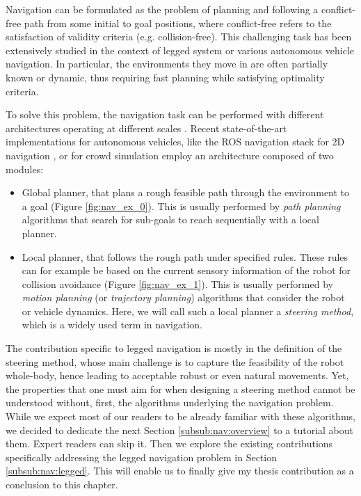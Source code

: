 Navigation can be formulated as the problem of planning and following a conflict-free path from some initial to goal positions, where conflict-free refers to the satisfaction of validity criteria (e.g. collision-free).
This challenging task has been extensively studied in the context of legged system or various autonomous vehicle navigation.
In particular, the environments they move in are often partially known or dynamic, thus requiring fast planning while satisfying optimality criteria.

To solve this problem, the navigation task can be performed with different architectures operating at different scales \cite{review_autonomous_2011}. 
Recent state-of-the-art implementations for autonomous vehicles, like the ROS navigation stack for 2D navigation \cite{ROS_software}, or for crowd simulation \cite{vantoll_microscopic_crowd_2021} employ an architecture composed of two modules:
\begin{itemize}
    \item Global planner, that plans a rough feasible path through the environment to a goal (Figure \ref{fig:nav_ex_0}). This is usually performed by \textit{path planning} algorithms that search for sub-goals to reach sequentially with a local planner.
    \item Local planner, that follows the rough path under specified rules. These rules can for example be based on the current sensory information of the robot for collision avoidance (Figure \ref{fig:nav_ex_1}). 
    This is usually performed by \textit{motion planning} (or \textit{trajectory planning}) algorithms that consider the robot or vehicle dynamics. Here, we will call such a local planner a \textit{steering method}, which is a widely used term in navigation.
\end{itemize}


The contribution specific to legged navigation is mostly in the definition of the steering method, whose main challenge is to capture the feasibility of the robot whole-body, hence leading to acceptable robust or even natural movements. Yet, the properties that one must aim for when designing a steering method cannot be understood without, first, the algorithms underlying the navigation problem.
While we expect most of our readers to be already familiar with these algorithms, we decided to dedicate the next Section \ref{subsub:nav:overview} to a tutorial about them. Expert readers can skip it. Then we explore the existing contributions specifically addressing
the legged navigation problem in Section \ref{subsub:nav:legged}. This will enable us to finally give my thesis contribution as a conclusion to this chapter.


